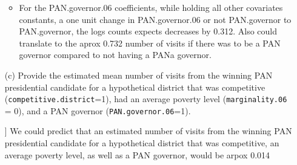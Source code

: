 \documentclass[12pt,letterpaper]{article}
\begin{document}
\begin{enumerate}
\begin{itemize}
		\item	For the PAN.governor.06 coefficients, while holding all other covariates constants, a one unit change in PAN.governor.06 or not PAN.governor to PAN.governor, the logs counts expects decreases by 0.312. Also could translate to the aprox 0.732 number of visits if there was to be a PAN governor compared to not having a PANa governor.
	\end{itemize}	
	\item [(c)]
	Provide the estimated mean number of visits from the winning PAN presidential candidate for a hypothetical district that was competitive (\texttt{competitive.district}=1), had an average poverty level (\texttt{marginality.06} = 0), and a PAN governor (\texttt{PAN.governor.06}=1).
	
		]
		We could predict that an estimated number of visits from the winning PAN presidential candidate for a hypothetical district that was competitive, an average poverty level, as well as a PAN governor,  would be arpox 0.014
	
\end{enumerate}
\end{document}
